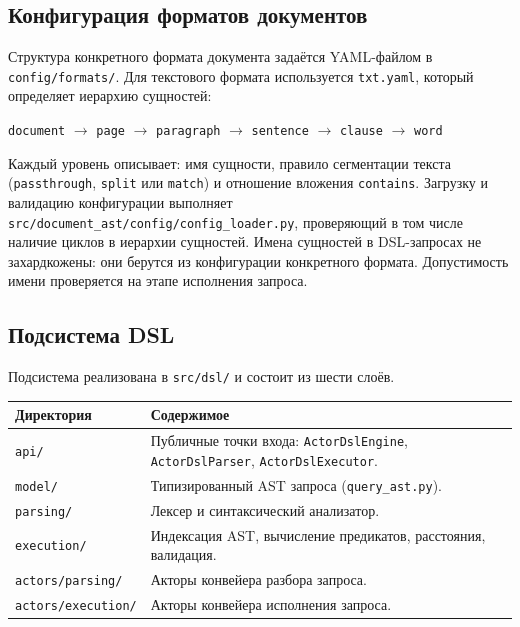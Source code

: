 \documentclass[a4paper,12pt]{article}
\begin{document}
\subsection{Конфигурация форматов документов}

Структура конкретного формата документа задаётся YAML-файлом в \texttt{config/formats/}. Для текстового формата используется \texttt{txt.yaml}, который определяет иерархию сущностей:

\begin{center}
\texttt{document} $\to$ \texttt{page} $\to$ \texttt{paragraph} $\to$ \texttt{sentence} $\to$ \texttt{clause} $\to$ \texttt{word}
\end{center}

Каждый уровень описывает: имя сущности, правило сегментации текста (\texttt{passthrough}, \texttt{split} или \texttt{match}) и отношение вложения \texttt{contains}. Загрузку и валидацию конфигурации выполняет \texttt{src/document\_ast/config/config\_loader.py}, проверяющий в том числе наличие циклов в иерархии сущностей. Имена сущностей в DSL-запросах не захардкожены: они берутся из конфигурации конкретного формата. Допустимость имени проверяется на этапе исполнения запроса.

\subsection{Подсистема DSL}

Подсистема реализована в \texttt{src/dsl/} и состоит из шести слоёв.

\begin{table}[h!]
\centering
\small
\begin{tabularx}{\textwidth}{lX}
\toprule
\textbf{Директория}         & \textbf{Содержимое} \\
\midrule
\texttt{api/}               & Публичные точки входа: \texttt{ActorDslEngine}, \texttt{ActorDslParser}, \texttt{ActorDslExecutor}. \\
\texttt{model/}             & Типизированный AST запроса (\texttt{query\_ast.py}). \\
\texttt{parsing/}           & Лексер и синтаксический анализатор. \\
\texttt{execution/}         & Индексация AST, вычисление предикатов, расстояния, валидация. \\
\texttt{actors/parsing/}    & Акторы конвейера разбора запроса. \\
\texttt{actors/execution/}  & Акторы конвейера исполнения запроса. \\
\bottomrule
\end{tabularx}
\end{table}
\end{document}
